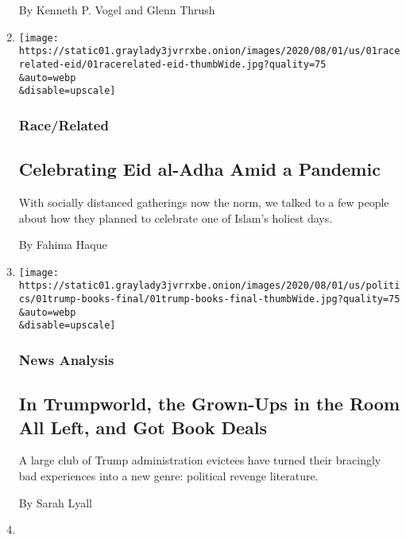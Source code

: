\begin{enumerate}
  By Kenneth P. Vogel and Glenn Thrush
\item
  \href{/2020/08/01/us/eid-al-adha-coronavirus.html}{}

  \texttt{[image: https://static01.graylady3jvrrxbe.onion/images/2020/08/01/us/01racerelated-eid/01racerelated-eid-thumbWide.jpg?quality=75\\\&auto=webp\\\&disable=upscale]}

  \hypertarget{racerelated-1}{%
  \subsubsection{Race/Related}\label{racerelated-1}}

  \hypertarget{celebrating-eid-al-adha-amid-a-pandemic-1}{%
  \subsection{Celebrating Eid al-Adha Amid a
  Pandemic}\label{celebrating-eid-al-adha-amid-a-pandemic-1}}

  With socially distanced gatherings now the norm, we talked to a few
  people about how they planned to celebrate one of Islam's holiest
  days.

  By Fahima Haque
\item
  \href{/2020/08/01/us/politics/trump-books.html}{}

  \texttt{[image: https://static01.graylady3jvrrxbe.onion/images/2020/08/01/us/politics/01trump-books-final/01trump-books-final-thumbWide.jpg?quality=75\\\&auto=webp\\\&disable=upscale]}

  \hypertarget{news-analysis}{%
  \subsubsection{News Analysis}\label{news-analysis}}

  \hypertarget{in-trumpworld-the-grown-ups-in-the-room-all-left-and-got-book-deals}{%
  \subsection{In Trumpworld, the Grown-Ups in the Room All Left, and Got
  Book
  Deals}\label{in-trumpworld-the-grown-ups-in-the-room-all-left-and-got-book-deals}}

  A large club of Trump administration evictees have turned their
  bracingly bad experiences into a new genre: political revenge
  literature.

  By Sarah Lyall
\item
  \href{/2020/08/01/science/nasa-spacex-astronauts.html}{}


\end{enumerate}

